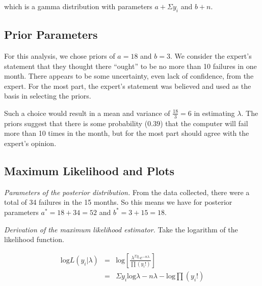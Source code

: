 \documentclass[12pt]{article}
\begin{document}
\noindent which is a gamma distribution with parameters $a+\Sigma y_i$ and $b+n$.  %

\subsection{Prior Parameters}

\noindent For this analysis, we chose priors of $a=18$ and $b=3$.  We consider the expert's statement that they thought there ``ought'' to be no more than 10 failures in one month.  There appears to be some uncertainty, even lack of confidence, from the expert.  For the most part, the expert's statement was believed and used as the basis in selecting the priors.
\bigskip

\noindent Such a choice would result in a mean and variance of $\frac{18}{3}=6$ in estimating $\lambda$.  The priors suggest that there is some probability ($0.39$) that the computer will fail more than 10 times in the month, but for the most part should agree with the expert's opinion.

\subsection{Maximum Likelihood and Plots}

%

\noindent \textit{Parameters of the posterior distribution.}  From the data collected, there were a total of 34 failures in the 15 months.  So this means we have for posterior parameters $a^*=18+34=52$ and $b^*=3+15=18$.
\bigskip

\noindent \textit{Derivation of the maximum likelihood estimator.}  Take the logarithm of the likelihood function.

\begin{eqnarray*}
\mathrm{log}L(y_i|\lambda) &=& \mathrm{log}\left[\frac{\lambda^{\Sigma y_i}e^{-n\lambda}}{\prod (y_i!)}\right] \\
&=& \Sigma y_i\mathrm{log}\lambda-n\lambda-\mathrm{log}\prod (y_i!) \\
\end{eqnarray*}
\end{document}
